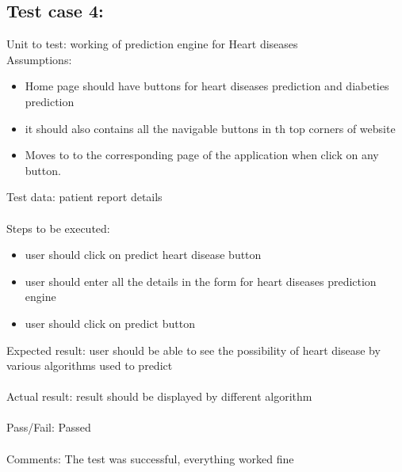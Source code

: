 \documentclass[oneside,12pt]{Classes/VTU}
\begin{document}
	\subsection{Test case 4:}
	Unit to test: working of prediction engine for Heart diseases \\
	Assumptions:\\
	\begin{itemize}
		\item Home page should have buttons for heart diseases prediction and diabeties prediction
		\item it should also contains all the navigable buttons in th top corners of website
		\item Moves to to the corresponding page of the application when click on any button.
	\end{itemize}
	Test data: patient report details\\
	\\
	Steps to be executed:\\
	\begin{itemize}
		\item user should click on predict heart disease button
		\item user should enter all the details in the form for heart diseases prediction engine
		\item user should click on predict button
	\end{itemize}
	Expected result:  user should be able to see the possibility of heart disease by various algorithms used to predict\\
	\\
	Actual result: result should be displayed by different algorithm\\
	\\
	Pass/Fail: Passed\\
	\\
	Comments: The test was successful, everything worked fine
	
\end{document}
